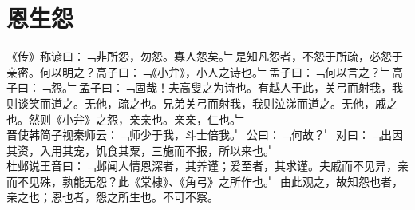 \chapter{恩生怨}%
《传》称谚曰：﹁非所怨，勿怨。寡人怨矣。﹂是知凡怨者，不怨于所疏，必怨于亲密。何以明之？高子曰：﹁《小弁》，小人之诗也。﹂孟子曰：﹁何以言之？﹂高子曰：﹁怨。﹂孟子曰：﹁固哉！夫高叟之为诗也。有越人于此，关弓而射我，我则谈笑而道之。无他，疏之也。兄弟关弓而射我，我则泣涕而道之。无他，戚之也。然则《小弁》之怨，亲亲也。亲亲，仁也。﹂\\
晋使韩简子视秦师云：﹁师少于我，斗士倍我。﹂公曰：﹁何故？﹂对曰：﹁出因其资，入用其宠，饥食其粟，三施而不报，所以来也。﹂\\
杜邺说王音曰：﹁邺闻人情恩深者，其养谨；爱至者，其求谨。夫戚而不见异，亲而不见殊，孰能无怨？此《棠棣》、《角弓》之所作也。﹂由此观之，故知怨也者，亲之也；恩也者，怨之所生也。不可不察。
%
%
